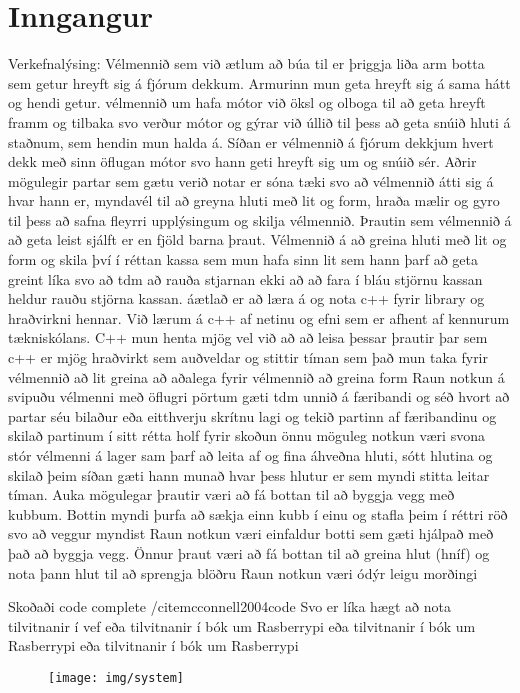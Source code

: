 \section{Inngangur}
Verkefnalýsing: 
Vélmennið sem við ætlum að búa til er þriggja liða arm botta sem getur hreyft sig á fjórum dekkum. Armurinn mun geta hreyft sig á sama hátt og hendi getur. vélmennið um hafa mótor við öksl og olboga til að geta hreyft framm og tilbaka svo verður mótor og gýrar við úllið til þess að geta snúið hluti á staðnum, sem hendin mun halda á. Síðan er vélmennið á fjórum dekkjum hvert dekk með sinn öflugan mótor svo hann geti hreyft sig um og snúið sér. Aðrir mögulegir partar sem gætu verið notar er sóna tæki svo að vélmennið átti sig á hvar hann er, myndavél til að greyna hluti með lit og form, hraða mælir og gyro til þess að safna fleyrri upplýsingum og skilja vélmennið.
Þrautin sem vélmennið á að geta leist sjálft er en fjöld barna þraut. Vélmennið á að greina hluti með lit og form og skila því í réttan kassa sem mun hafa sinn lit sem hann þarf að geta greint líka svo að tdm að rauða stjarnan ekki að að fara í bláu stjörnu kassan heldur rauðu stjörna kassan.
áætlað er að læra á og nota c++ fyrir library og hraðvirkni hennar. Við lærum á c++ af netinu og efni sem er afhent af kennurum tækniskólans. C++ mun henta mjög vel við að að leisa þessar þrautir þar sem c++ er mjög hraðvirkt sem auðveldar og stittir tíman sem það mun taka fyrir vélmennið að lit greina að aðalega fyrir vélmennið að greina form
Raun notkun á svipuðu vélmenni með öflugri pörtum gæti tdm unnið á færibandi og séð hvort að partar séu bilaður eða eitthverju skrítnu lagi og tekið partinn af færibandinu og skilað  partinum í sitt rétta holf fyrir skoðun önnu möguleg notkun væri  svona stór vélmenni á lager sam þarf að leita af og fina áhveðna hluti, sótt hlutina og skilað þeim síðan gæti hann munað hvar þess hlutur er sem myndi stitta leitar tíman.
Auka mögulegar þrautir væri að fá bottan til að byggja vegg með kubbum. Bottin myndi þurfa að sækja einn kubb í einu og stafla þeim í réttri röð svo að veggur myndist
Raun notkun væri einfaldur botti sem gæti hjálpað með það að byggja vegg.
Önnur þraut væri að fá bottan til að greina hlut (hníf) og nota þann hlut til að sprengja blöðru
Raun notkun væri ódýr leigu morðingi


Skoðaði code complete /cite{mcconnell2004code}
Svo er líka hægt að nota tilvitnanir í vef \cite{WinNT}
eða tilvitnanir í bók um Rasberrypi \cite{brock2013changing}
eða tilvitnanir í bók um Rasberrypi \cite{test}
eða tilvitnanir í bók um Rasberrypi \cite{test2}
\begin{figure}[h]
\texttt{[image: img/system]}
\end{figure}